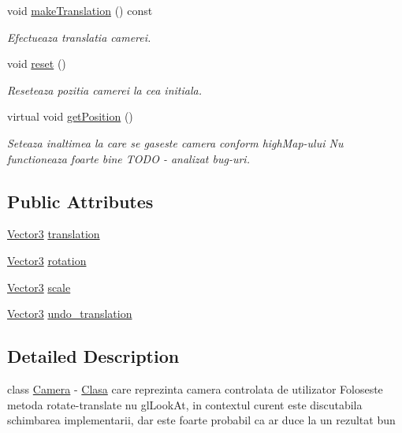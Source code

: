 \begin{DoxyCompactItemize}
void \hyperlink{class_camera_aa2d535ba7952ee33c37e84461d57f1c2}{make\-Translation} () const 
\begin{DoxyCompactList}\small\item\em Efectueaza translatia camerei. \end{DoxyCompactList}\item 
void \hyperlink{class_camera_a02be8aa0dbef77e02dddc715a726fb67}{reset} ()
\begin{DoxyCompactList}\small\item\em Reseteaza pozitia camerei la cea initiala. \end{DoxyCompactList}\item 
virtual void \hyperlink{class_camera_a303cfefa7f5d925e911000cf3fbdfd39}{get\-Position} ()
\begin{DoxyCompactList}\small\item\em Seteaza inaltimea la care se gaseste camera conform high\-Map-\/ului Nu functioneaza foarte bine T\-O\-D\-O -\/ analizat bug-\/uri. \end{DoxyCompactList}\end{DoxyCompactItemize}
\subsection*{Public Attributes}
\begin{DoxyCompactItemize}
\item 
\hyperlink{struct_vector3}{Vector3} \hyperlink{class_camera_ad86bc5edaaf030fa76edac96040e56f4}{translation}
\item 
\hyperlink{struct_vector3}{Vector3} \hyperlink{class_camera_a49d1e42b190a89485c29b6a0bd0fb19b}{rotation}
\item 
\hyperlink{struct_vector3}{Vector3} \hyperlink{class_camera_a048f3227386a7874d82d5a955eab803c}{scale}
\item 
\hyperlink{struct_vector3}{Vector3} \hyperlink{class_camera_aa2e21e07158e70c900e1a8473b4e96d7}{undo\-\_\-translation}
\end{DoxyCompactItemize}


\subsection{Detailed Description}
class \hyperlink{class_camera}{Camera} -\/ \hyperlink{class_clasa}{Clasa} care reprezinta camera controlata de utilizator Foloseste metoda rotate-\/translate nu gl\-Look\-At, in contextul curent este discutabila schimbarea implementarii, dar este foarte probabil ca ar duce la un rezultat bun 

